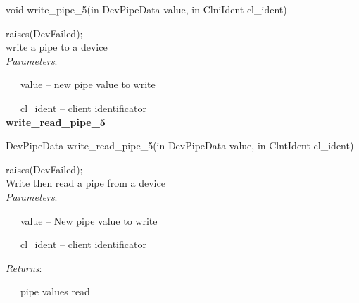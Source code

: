 void write\_pipe\_5(in DevPipeData value, in ClniIdent cl\_ident)

raises(DevFailed);\\


write a pipe to a device\\


\emph{Parameters}:

~~~value -- new pipe value to write

~~~cl\_ident -- client identificator\\


\textbf{write\_read\_pipe\_5}

DevPipeData write\_read\_pipe\_5(in DevPipeData value, in ClntIdent
cl\_ident)

raises(DevFailed);\\


Write then read a pipe from a device\\


\emph{Parameters}:

~~~value -- New pipe value to write

~~~cl\_ident -- client identificator

\emph{Returns}:

~~~pipe values read
